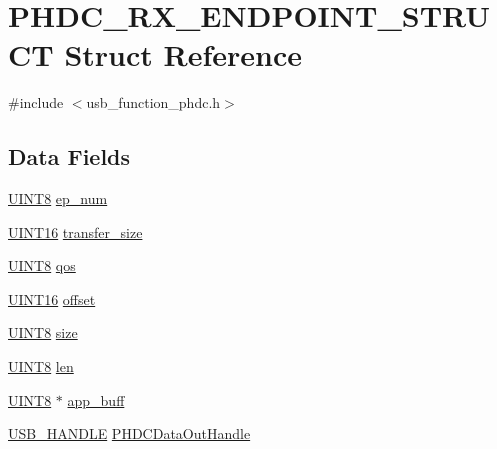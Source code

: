 \hypertarget{struct_p_h_d_c___r_x___e_n_d_p_o_i_n_t___s_t_r_u_c_t}{}\section{P\+H\+D\+C\+\_\+\+R\+X\+\_\+\+E\+N\+D\+P\+O\+I\+N\+T\+\_\+\+S\+T\+R\+U\+C\+T Struct Reference}
\label{struct_p_h_d_c___r_x___e_n_d_p_o_i_n_t___s_t_r_u_c_t}


{\ttfamily \#include $<$usb\+\_\+function\+\_\+phdc.\+h$>$}

\subsection*{Data Fields}
\begin{DoxyCompactItemize}
\item 
\hyperlink{_generic_type_defs_8h_ab27e9918b538ce9d8ca692479b375b6a}{U\+I\+N\+T8} \hyperlink{struct_p_h_d_c___r_x___e_n_d_p_o_i_n_t___s_t_r_u_c_t_a25fcc3634cbe369ae4b830c897103a0f}{ep\+\_\+num}
\item 
\hyperlink{_generic_type_defs_8h_acfa284fa8026c4aace2728f7f15d6c13}{U\+I\+N\+T16} \hyperlink{struct_p_h_d_c___r_x___e_n_d_p_o_i_n_t___s_t_r_u_c_t_a4bf75e6c826876c02decdae1f52a7a55}{transfer\+\_\+size}
\item 
\hyperlink{_generic_type_defs_8h_ab27e9918b538ce9d8ca692479b375b6a}{U\+I\+N\+T8} \hyperlink{struct_p_h_d_c___r_x___e_n_d_p_o_i_n_t___s_t_r_u_c_t_a992b69bcb851a8af26e51c2167b72fb5}{qos}
\item 
\hyperlink{_generic_type_defs_8h_acfa284fa8026c4aace2728f7f15d6c13}{U\+I\+N\+T16} \hyperlink{struct_p_h_d_c___r_x___e_n_d_p_o_i_n_t___s_t_r_u_c_t_af7c1ea69079dc905761ed0a19ec036ab}{offset}
\item 
\hyperlink{_generic_type_defs_8h_ab27e9918b538ce9d8ca692479b375b6a}{U\+I\+N\+T8} \hyperlink{struct_p_h_d_c___r_x___e_n_d_p_o_i_n_t___s_t_r_u_c_t_ac86594fb76193cdd5825e2a13c09f1bd}{size}
\item 
\hyperlink{_generic_type_defs_8h_ab27e9918b538ce9d8ca692479b375b6a}{U\+I\+N\+T8} \hyperlink{struct_p_h_d_c___r_x___e_n_d_p_o_i_n_t___s_t_r_u_c_t_a197a42ec85f4898bd19c17b05bc07d81}{len}
\item 
\hyperlink{_generic_type_defs_8h_ab27e9918b538ce9d8ca692479b375b6a}{U\+I\+N\+T8} $\ast$ \hyperlink{struct_p_h_d_c___r_x___e_n_d_p_o_i_n_t___s_t_r_u_c_t_ad604bb911b340f7f663b855e02950c54}{app\+\_\+buff}
\item 
\hyperlink{usb__device_8h_a2607555f418d28086253a65d5e481131}{U\+S\+B\+\_\+\+H\+A\+N\+D\+L\+E} \hyperlink{struct_p_h_d_c___r_x___e_n_d_p_o_i_n_t___s_t_r_u_c_t_adc02dbcf4686abc8b270ab42dc9f4fdb}{P\+H\+D\+C\+Data\+Out\+Handle}
\end{DoxyCompactItemize}


